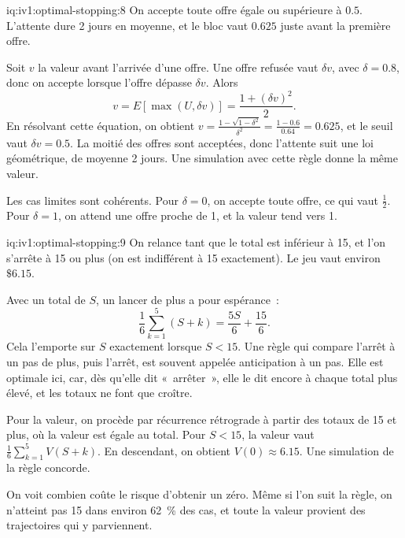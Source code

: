 \begin{solution}{iq:iv1:optimal-stopping:8}
On accepte toute offre égale ou supérieure à $0.5$. L'attente dure 2 jours en moyenne, et le bloc vaut $0.625$ juste avant la première offre.

Soit $v$ la valeur avant l'arrivée d'une offre. Une offre refusée vaut $\delta v$, avec $\delta = 0.8$, donc on accepte lorsque l'offre dépasse $\delta v$. Alors
\[
v = E[\max(U, \delta v)] = \frac{1 + (\delta v)^2}{2}.
\]
En résolvant cette équation, on obtient $v = \frac{1 - \sqrt{1 - \delta^2}}{\delta^2} = \frac{1 - 0.6}{0.64} = 0.625$, et le seuil vaut $\delta v = 0.5$. La moitié des offres sont acceptées, donc l'attente suit une loi géométrique, de moyenne 2 jours. Une simulation avec cette règle donne la même valeur.

Les cas limites sont cohérents. Pour $\delta = 0$, on accepte toute offre, ce qui vaut $\tfrac12$. Pour $\delta = 1$, on attend une offre proche de 1, et la valeur tend vers 1.

\end{solution}

\begin{solution}{iq:iv1:optimal-stopping:9}
On relance tant que le total est inférieur à 15, et l'on s'arrête à 15 ou plus (on est indifférent à 15 exactement). Le jeu vaut environ $\$6.15$.

Avec un total de $S$, un lancer de plus a pour espérance~:
\[
\frac16 \sum_{k = 1}^{5} (S + k) = \frac{5S}{6} + \frac{15}{6}.
\]
Cela l'emporte sur $S$ exactement lorsque $S < 15$. Une règle qui compare l'arrêt à un pas de plus, puis l'arrêt, est souvent appelée anticipation à un pas. Elle est optimale ici, car, dès qu'elle dit «~arrêter~», elle le dit encore à chaque total plus élevé, et les totaux ne font que croître.

Pour la valeur, on procède par récurrence rétrograde à partir des totaux de 15 et plus, où la valeur est égale au total. Pour $S < 15$, la valeur vaut $\frac16\sum_{k = 1}^5 V(S + k)$. En descendant, on obtient $V(0) \approx 6.15$. Une simulation de la règle concorde.

On voit combien coûte le risque d'obtenir un zéro. Même si l'on suit la règle, on n'atteint pas 15 dans environ 62~\% des cas, et toute la valeur provient des trajectoires qui y parviennent.

\end{solution}

